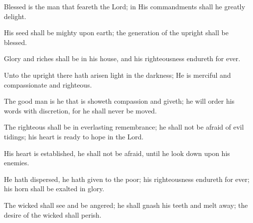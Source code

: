 Blessed is the man that feareth the Lord; in His commandments shall he greatly delight.

His seed shall be mighty upon earth; the generation of the upright shall be blessed.

Glory and riches shall be in his house, and his righteousness endureth for ever.

Unto the upright there hath arisen light in the darkness; He is merciful and compassionate and righteous.

The good man is he that is showeth compassion and giveth; he will order his words with discretion, for he shall never be moved.

The righteous shall be in everlasting remembrance; he shall not be afraid of evil tidings; his heart is ready to hope in the Lord.

His heart is established, he shall not be afraid, until he look down upon his enemies.

He hath dispersed, he hath given to the poor; his righteousness endureth for ever; his horn shall be exalted in glory.

The wicked shall see and be angered; he shall gnash his teeth and melt away; the desire of the wicked shall perish.
